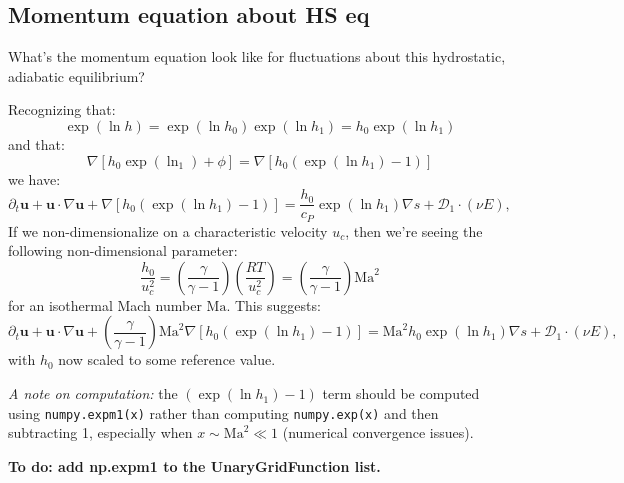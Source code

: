 \documentclass{aastex62}
\newcommand{\del}{\nabla}
\renewcommand{\vec}{\boldsymbol}
\newcommand{\scrD}{\mathcal{D}}
\begin{document}
\subsection{Momentum equation about HS eq}

What's the momentum equation look like for fluctuations about this hydrostatic, adiabatic equilibrium?

Recognizing that:
\begin{equation}
  \exp{(\ln h)} = \exp{(\ln h_0)}\exp{(\ln h_1)} = h_0 \exp{(\ln h_1)}
\end{equation}
and that:
\begin{equation}
  \del \left[h_0 \exp{(\ln_1)} + \phi\right] = \del\left[h_0\left(\exp{(\ln h_1)}-1\right)\right]
\end{equation}
we have:
\begin{equation}
  \partial_t \vec{u} + \vec{u}\cdot \del\vec{u} + \del\left[h_0\left(\exp{(\ln h_1)}-1\right)\right] = \frac{h_0}{c_P}\exp{(\ln h_1)}\del s + \vec{\scrD}_1\cdot(\nu E),
\end{equation}
If we non-dimensionalize on a characteristic velocity $u_c$, then we're seeing the following non-dimensional parameter:
\begin{equation}
  \frac{h_0}{u_c^2} = \left(\frac{\gamma}{\gamma-1}\right)\left(\frac{R T}{u_c^2}\right) = \left(\frac{\gamma}{\gamma-1}\right) \mathrm{Ma}^2
\end{equation}
for an isothermal Mach number $\mathrm{Ma}$.  This suggests:
\begin{equation}
  \partial_t \vec{u} + \vec{u}\cdot \del\vec{u} + \left(\frac{\gamma}{\gamma-1}\right) \mathrm{Ma}^2 \del\left[h_0\left(\exp{(\ln h_1)}-1\right)\right] = \mathrm{Ma}^2 h_0 \exp{(\ln h_1)}\del s + \vec{\scrD}_1\cdot(\nu E),
\end{equation}
with $h_0$ now scaled to some reference value.

\emph{A note on computation:} the $\left(\exp{(\ln h_1)}-1\right)$ term should be computed using \verb+numpy.expm1(x)+ rather than computing \verb+numpy.exp(x)+ and then subtracting 1, especially when $x \sim \mathrm{Ma}^2 \ll 1$ (numerical convergence issues).

\textbf{To do: add np.expm1 to the UnaryGridFunction list.}
\end{document}
